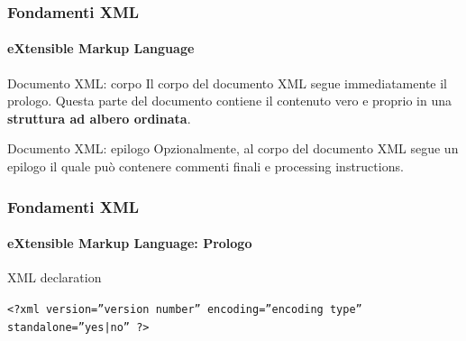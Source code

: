\begin{frame}
	\frametitle{Fondamenti XML}
	\framesubtitle{eXtensible Markup Language}
	\addtocounter{nframe}{1}

	\begin{block}{Documento XML: corpo}
		Il corpo del documento XML segue immediatamente il prologo. Questa parte del documento contiene il contenuto vero e proprio in una \textbf{struttura ad albero ordinata}.
	\end{block}

	\begin{block}{Documento XML: epilogo}
		Opzionalmente, al corpo del documento XML segue un epilogo il quale può contenere commenti finali e processing instructions.
	\end{block}
	

\end{frame}

\begin{frame}
	\frametitle{Fondamenti XML}
	\framesubtitle{eXtensible Markup Language: Prologo}
	\addtocounter{nframe}{1}

	\begin{block}{XML declaration}
    \begin{center}\texttt{<?xml version=”version number” encoding=”encoding type” standalone=”yes|no” ?>}\end{center}
	\end{block}

\end{frame}




